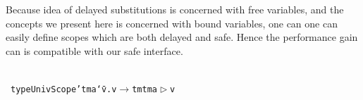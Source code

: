 \documentclass[9pt,preprint,authoryear]{sigplanconf}
\begin{document}
%
Because idea of delayed substitutions is concerned with free variables, and
    the concepts we present here is concerned with bound variables, one can
    one can easily define scopes which are both delayed and safe. Hence
    the performance gain can is compatible with our safe interface.%


%
%


{\nopagebreak }

%
%
%
~\\~\vphantom{$\{$}\textcolor[cmyk]{0,0.65,0.99,0}{\texttt{type}}\textcolor[rgb]{0,0,0.80}{\texttt{\mbox{\hspace{0.50em}}}}\textcolor[rgb]{0,0,0.80}{\texttt{UnivScope{'}}}\textcolor[rgb]{0,0,0.80}{\texttt{\mbox{\hspace{0.50em}}}}\textcolor[rgb]{0,0,0.80}{\texttt{\mbox{\hspace{0.50em}}}}\textcolor[rgb]{0,0,0.80}{\texttt{tm}}\textcolor[rgb]{0,0,0.80}{\texttt{\mbox{\hspace{0.50em}}}}\textcolor[rgb]{0,0,0.80}{\texttt{a}}\textcolor[rgb]{0,0,0.80}{\texttt{\mbox{\hspace{0.50em}}}}\textcolor[cmyk]{0,0.65,0.99,0}{\texttt{{\char `\=}}}\textcolor[rgb]{0,0,0.80}{\texttt{\mbox{\hspace{0.50em}}}}\textcolor[cmyk]{0,0.65,0.99,0}{\texttt{\makebox[1.22ex][c]{$ \forall $}}}\textcolor[rgb]{0,0,0.80}{\texttt{v}}\textcolor[cmyk]{0,0.65,0.99,0}{\texttt{.}}\textcolor[rgb]{0,0,0.80}{\texttt{\mbox{\hspace{0.50em}}}}\textcolor[cmyk]{0,0.65,0.99,0}{\texttt{\makebox[1.22ex][l]{$ {(} $}}}\textcolor[rgb]{0,0,0.80}{\texttt{v}}\textcolor[rgb]{0,0,0.80}{\texttt{\mbox{\hspace{0.50em}}}}\textcolor[cmyk]{0,0.65,0.99,0}{\texttt{$ \rightarrow $}}\textcolor[rgb]{0,0,0.80}{\texttt{\mbox{\hspace{0.50em}}}}\textcolor[rgb]{0,0,0.80}{\texttt{tm}}\textcolor[rgb]{0,0,0.80}{\texttt{\mbox{\hspace{0.50em}}}}\textcolor[cmyk]{0,0.65,0.99,0}{\texttt{\makebox[1.22ex][l]{$ {(} $}}}\textcolor[rgb]{0,0,0.80}{\texttt{tm}}\textcolor[rgb]{0,0,0.80}{\texttt{\mbox{\hspace{0.50em}}}}\textcolor[rgb]{0,0,0.80}{\texttt{a}}\textcolor[rgb]{0,0,0.80}{\texttt{\mbox{\hspace{0.50em}}}}\textcolor[rgb]{0,0,0.80}{\texttt{$ \vartriangleright $}}\textcolor[rgb]{0,0,0.80}{\texttt{\mbox{\hspace{0.50em}}}}\textcolor[rgb]{0,0,0.80}{\texttt{v}}\textcolor[cmyk]{0,0.65,0.99,0}{\texttt{\makebox[1.22ex][r]{$ {)} $}}}\textcolor[cmyk]{0,0.65,0.99,0}{\texttt{\makebox[1.22ex][r]{$ {)} $}}}\textcolor[rgb]{0,0,0.80}{\texttt{{\nopagebreak \newline%
}}}
\end{document}
